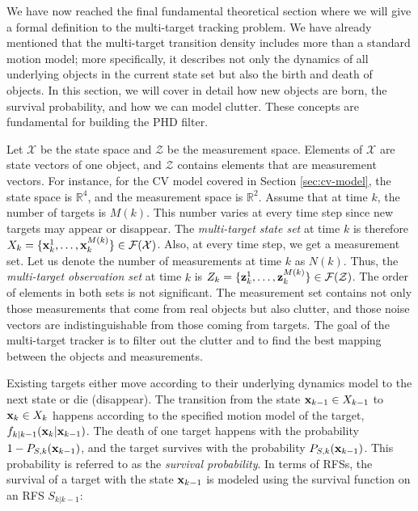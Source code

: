 We have now reached the final fundamental theoretical section where we will give a formal definition to the multi-target tracking problem. We have already mentioned that the multi-target transition density includes more than a standard motion model; more specifically, it describes not only the dynamics of all underlying objects in the current state set but also the birth and death of objects. In this section, we will cover in detail how new objects are born, the survival probability, and how we can model clutter. These concepts are fundamental for building the PHD filter.

Let $\mathcal{X}$ be the state space and $\mathcal{Z}$ be the measurement space. Elements of $\mathcal{X}$ are state vectors of one object, and $\mathcal{Z}$ contains elements that are measurement vectors. For instance, for the CV model covered in Section \ref{sec:cv-model}, the state space is $\mathbb{R}^4$, and the measurement space is $\mathbb{R}^2$. Assume that at time $k$, the number of targets is $M(k)$. This number varies at every time step since new targets may appear or disappear. The \textit{multi-target state set} at time $k$ is therefore $X_k = \{\svecat{x}{k}{1}, \ldots, \svecat{x}{k}{M(k)}\} \in \mathcal{F}(\mathcal{X})$. Also, at every time step, we get a measurement set. Let us denote the number of measurements at time $k$ as $N(k)$. Thus, the \textit{multi-target observation set} at time $k$ is $Z_k = \{\svecat{z}{k}{1}, \ldots, \svecat{z}{k}{M(k)}\} \in \mathcal{F}(\mathcal{Z})$. The order of elements in both sets is not significant. The measurement set contains not only those measurements that come from real objects but also clutter, and those noise vectors are indistinguishable from those coming from targets. The goal of the multi-target tracker is to filter out the clutter and to find the best mapping between the objects and measurements.

Existing targets either move according to their underlying dynamics model to the next state or die (disappear). The transition from the state $\vecat{x}{k-1} \in X_{k-1}$ to $\vecat{x}{k} \in X_{k}$ happens according to the specified motion model of the target, $f_{k|k-1}(\vecat{x}{k} | \vecat{x}{k-1})$. The death of one target happens with the probability $1 - P_{S,k}(\vecat{x}{k-1})$, and the target survives with the probability $P_{S,k}(\vecat{x}{k-1})$. This probability is referred to as the \textit{survival probability}. In terms of RFSs, the survival of a target with the state $\vecat{x}{k-1}$ is modeled using the survival function on an RFS $S_{k|k-1}$:

